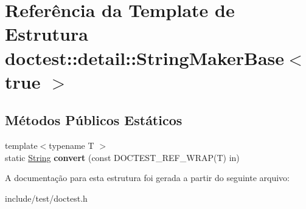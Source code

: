 \hypertarget{structdoctest_1_1detail_1_1StringMakerBase_3_01true_01_4}{}\section{Referência da Template de Estrutura doctest\+:\+:detail\+:\+:String\+Maker\+Base$<$ true $>$}
\label{structdoctest_1_1detail_1_1StringMakerBase_3_01true_01_4}
\subsection*{Métodos Públicos Estáticos}
\begin{DoxyCompactItemize}
\item 
\mbox{\label{structdoctest_1_1detail_1_1StringMakerBase_3_01true_01_4_ae1a11dee413117f36e335677589b047f}} 
{\footnotesize template$<$typename T $>$ }\\static \hyperlink{classdoctest_1_1String}{String} {\bfseries convert} (const D\+O\+C\+T\+E\+S\+T\+\_\+\+R\+E\+F\+\_\+\+W\+R\+AP(T) in)
\end{DoxyCompactItemize}


A documentação para esta estrutura foi gerada a partir do seguinte arquivo\+:\begin{DoxyCompactItemize}
\item 
include/test/doctest.\+h\end{DoxyCompactItemize}

